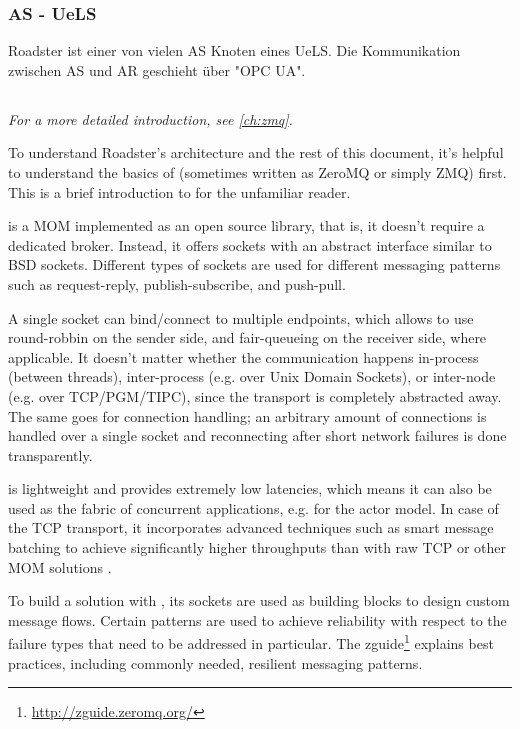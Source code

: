 \subsubsection{AS - UeLS}
Roadster ist einer von vielen AS Knoten eines UeLS. Die Kommunikation
zwischen AS und AR geschieht über "OPC UA".


\subsection{\zmq}
\emph{For a more detailed introduction, see \autoref{ch:zmq}.}

To understand Roadster's architecture and the rest of this document, it's
helpful to understand the basics of \zmq (sometimes written as ZeroMQ or simply
ZMQ) first. This is a brief introduction to \zmq for the unfamiliar reader.

\zmq is a MOM implemented as an open source library, that is, it doesn't
require a dedicated broker. Instead, it offers sockets with an abstract
interface similar to BSD sockets. Different types of sockets are used for
different messaging patterns such as request-reply, publish-subscribe, and
push-pull.

A single socket can bind/connect to multiple endpoints, which allows \zmq to
use round-robbin on the sender side, and fair-queueing on the receiver side,
where applicable. It doesn't matter whether the communication happens
in-process (between threads), inter-process (e.g. over Unix Domain Sockets), or
inter-node (e.g. over TCP/PGM/TIPC), since the transport is completely
abstracted away. The same goes for connection handling; an arbitrary amount of
connections is handled over a single socket and reconnecting after short
network failures is done transparently.

\zmq is lightweight and provides extremely low latencies, which means it can
also be used as the fabric of concurrent applications, e.g. for the actor
model. In case of the TCP transport, it incorporates advanced techniques such
as smart message batching to achieve significantly higher throughputs than with
raw TCP or other MOM solutions \cite[Figure 2, Middleware evaluation and
prototyping, p.~4]{cern:new-cmw}.

To build a solution with \zmq, its sockets are used as building blocks to
design custom message flows. Certain patterns are used to achieve reliability
with respect to the failure types that need to be addressed in particular.  The
zguide\footnote{\url{http://zguide.zeromq.org/}} explains best practices,
including commonly needed, resilient messaging patterns.


